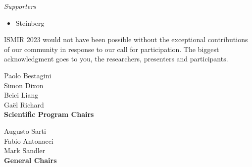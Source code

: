 \textit{Supporters}
\begin{itemize}\setlength{\parskip}{0pt}
    \item Steinberg
\end{itemize}

ISMIR 2023 would not have been possible without the exceptional contributions of our community in response to our call for participation. The biggest acknowledgment goes to you, the researchers, presenters and participants. 

Paolo Bestagini\\
Simon Dixon\\
Beici Liang\\
Gaël Richard\\
\textbf{Scientific Program Chairs}

Augusto Sarti\\
Fabio Antonacci\\
Mark Sandler\\
\textbf{General Chairs}
